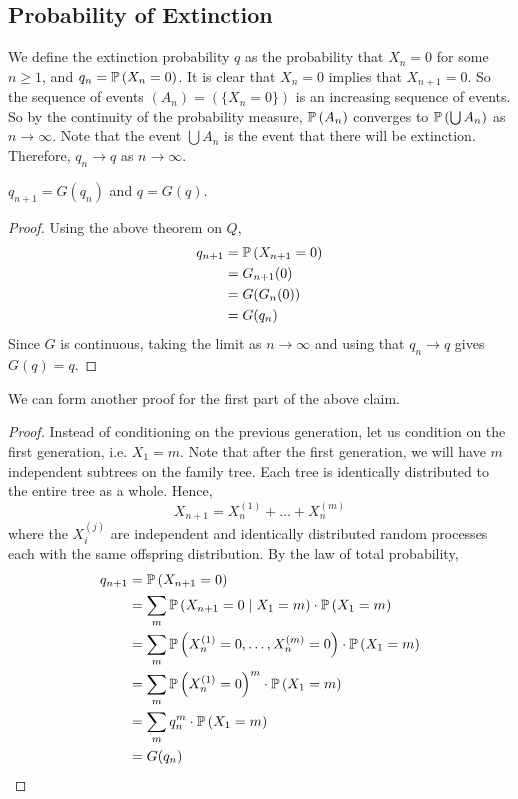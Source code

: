 \documentclass{article}
\begin{document}
\subsection{Probability of Extinction}
We define the extinction probability $q$ as the probability that $X_n = 0$ for some $n \geq 1$, and $q_n = \mathbb{P}\left({X_n = 0}\right)$. It is clear that $X_n = 0$ implies that $X_{n+1} = 0$. So the sequence of events $(A_n) = (\{ X_n = 0 \})$ is an increasing sequence of events. So by the continuity of the probability measure, $\mathbb{P}\left({A_n}\right)$ converges to $\mathbb{P}\left({\bigcup A_n}\right)$ as $n \to \infty$. Note that the event $\bigcup A_n$ is the event that there will be extinction. Therefore, $q_n \to q$ as $n \to \infty$.
\begin{claim}
	$q_{n+1} = G(q_n)$ and $q = G(q)$.
\end{claim}
\begin{proof}
	Using the above theorem on $Q$,
	\begin{align*}
		q_{n+1} & = \mathbb{P}\left({X_{n+1} = 0}\right) \\
		        & = G_{n+1}(0)         \\
		        & = G(G_n(0))          \\
		        & = G(q_n)
	\end{align*}
	Since $G$ is continuous, taking the limit as $n \to \infty$ and using that $q_n \to q$ gives $G(q) = q$.
\end{proof}
\noindent We can form another proof for the first part of the above claim.
\begin{proof}
	Instead of conditioning on the previous generation, let us condition on the first generation, i.e. $X_1 = m$. Note that after the first generation, we will have $m$ independent subtrees on the family tree. Each tree is identically distributed to the entire tree as a whole. Hence,
	\[ X_{n+1} = X_n^{(1)} + \dots + X_n^{(m)} \]
	where the $X_i^{(j)}$ are independent and identically distributed random processes each with the same offspring distribution. By the law of total probability,
	\begin{align*}
		q_{n+1} & = \mathbb{P}\left({X_{n+1} = 0}\right)                                                     \\
		        & = \sum_m \mathbb{P}\left({X_{n+1} = 0 \mid X_1 = m}\right) \cdot \mathbb{P}\left({X_1 = m}\right)            \\
		        & = \sum_m \mathbb{P}\left({X_n^{(1)} = 0, \dots, X_n^{(m)} = 0}\right) \cdot \mathbb{P}\left({X_1 = m}\right) \\
		        & = \sum_m \mathbb{P}\left({X_n^{(1)} = 0}\right)^m \cdot \mathbb{P}\left({X_1 = m}\right)                     \\
		        & = \sum_m q_n^m \cdot \mathbb{P}\left({X_1 = m}\right)                                      \\
		        & = G(q_n)
	\end{align*}
\end{proof}
\end{document}
